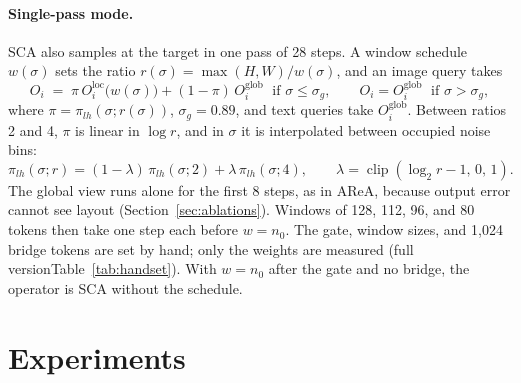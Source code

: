\documentclass{article} %
\newif\ifresra      \resrafalse
\newcommand{\shortalt}[2]{\ifshortversion#2\else#1\fi}
\providecommand{\raMethod}{The hand-off from the global view to the native window can be measured instead of set by hand. With $m_r(\sigma)$ the near share of full attention inside the ratio-$r$ window at $1024^2$, averaged over heads, the reach-annealed sampler keeps the global view until $m_2$ exceeds a threshold, reads a ratio-2 view whose 128-token window holds $64\times64$ block means of keys and values, and moves to the native window once $m_4$ exceeds the same threshold.}
\newcommand{\sca}{SCA}
\newcommand{\Oloc}{O^{\mathrm{loc}}}
\newcommand{\Oglob}{O^{\mathrm{glob}}}
\newcommand{\clip}{\operatorname{clip}}
\theoremstyle{remark}
\begin{document}
\paragraph{Single-pass mode.} \sca{} also samples at the target in one pass of 28 steps. A window schedule $w(\sigma)$ sets the ratio $r(\sigma)=\max(H,W)/w(\sigma)$, and an image query takes
\begin{equation}
  O_i \;=\; \pi\,\Oloc_i\big(w(\sigma)\big) + (1-\pi)\,\Oglob_i \;\text{ if } \sigma\le\sigma_g, \qquad O_i=\Oglob_i \;\text{ if } \sigma>\sigma_g,
  \label{eq:mix}
\end{equation}
where $\pi=\pi_{lh}(\sigma;r(\sigma))$, $\sigma_g=0.89$, and text queries take $\Oglob_i$. Between ratios 2 and 4, $\pi$ is linear in $\log r$, and in $\sigma$ it is interpolated between occupied noise bins:
\begin{equation}
  \pi_{lh}(\sigma;r)=(1-\lambda)\,\pi_{lh}(\sigma;2)+\lambda\,\pi_{lh}(\sigma;4),\qquad \lambda=\clip(\log_2 r-1,\,0,\,1).
  \label{eq:sched}
\end{equation}
The global view runs alone for the first 8 steps, as in AReA, because output error cannot see layout (Section~\ref{sec:ablations}). Windows of 128, 112, 96, and 80 tokens then take one step each before $w=n_0$. The gate, window sizes, and 1,024 bridge tokens are set by hand; only the weights are measured (\shortalt{Table~\ref{tab:handset}}{full version}). With $w=n_0$ after the gate and no bridge, the operator is \sca{} without the schedule.
\ifresra\ifdefined\raMethod\ifdefined\raResult

\paragraph{Measured hand-off.} \raMethod{} \raResult
\fi\fi\fi

\section{Experiments}
\label{sec:experiments}
\end{document}
